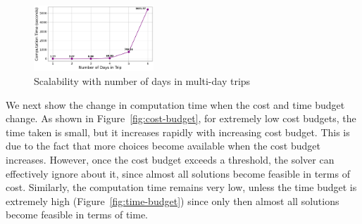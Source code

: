 \begin{figure}[th]
    \centering
\includegraphics[width=0.4\textwidth]{plots/scalability_multiday.png}
     \caption{Scalability with number of days in multi-day trips}
    \label{fig:number-of-days}
\end{figure}





We next show the change in computation time when the cost and time budget change.
As shown in Figure~\ref{fig:cost-budget}, for extremely low cost budgets, the time taken is small, but it increases rapidly with increasing cost budget. This is due to the fact that more choices become available when the cost budget increases. However, once the cost budget exceeds a threshold, the solver can effectively ignore about it, since almost all solutions become feasible in terms of cost.
Similarly, the computation time remains very low, unless the time budget is extremely high (Figure~\ref{fig:time-budget}) since only then almost all solutions become feasible in terms of time.

